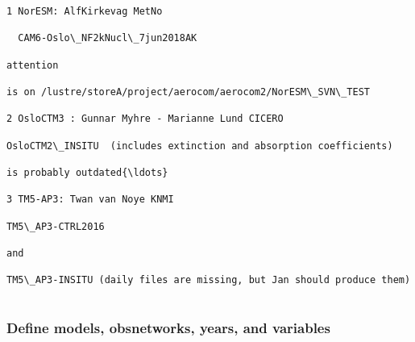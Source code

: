 \documentclass[11pt]{article}
\begin{document}
    \begin{Verbatim}[commandchars=\\\{\}]
1 NorESM: AlfKirkevag MetNo

  CAM6-Oslo\_NF2kNucl\_7jun2018AK

attention

is on /lustre/storeA/project/aerocom/aerocom2/NorESM\_SVN\_TEST

2 OsloCTM3 : Gunnar Myhre - Marianne Lund CICERO

OsloCTM2\_INSITU  (includes extinction and absorption coefficients)

is probably outdated{\ldots}

3 TM5-AP3: Twan van Noye KNMI

TM5\_AP3-CTRL2016

and

TM5\_AP3-INSITU (daily files are missing, but Jan should produce them)


    \end{Verbatim}

    \hypertarget{define-models-obsnetworks-years-and-variables}{%
\subsubsection{Define models, obsnetworks, years, and
variables}\label{define-models-obsnetworks-years-and-variables}}
\end{document}

